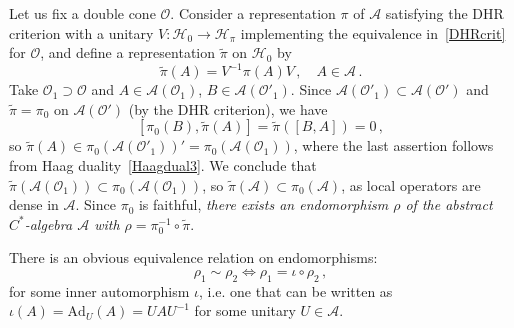 \documentclass[12pt,a4paper]{article}
\newcommand{\1}{\mathds{1}}                         %
\newcommand{\Hcal}{\mathcal {H}}
\newcommand{\Ocal}{\mathcal{O}}
\newcommand{\Ac}{{\mathcal{A}}}
\begin{document}
Let us fix a double cone $\Ocal$. Consider a representation $\pi$ of $\Ac$ satisfying the DHR criterion with a unitary $V:\Hcal_0\rightarrow\Hcal_{\pi}$ implementing the equivalence in~\eqref{DHRcrit} for $\Ocal$, and
define a representation $\tilde{\pi}$ on $\Hcal_0$ by
\[
\tilde{\pi}(A)=V^{-1}\pi(A) V\,,\quad A\in\Ac\,.
\]
Take $\Ocal_1\supset \Ocal$ and $A\in\Ac(\Ocal_1)$, $B\in\Ac(\Ocal'_1)$. Since $\Ac(\Ocal'_1)\subset \Ac(\Ocal')$ and $\tilde{\pi}=\pi_0$ on $\Ac(\Ocal')$ (by the DHR criterion), we have
\[
[\pi_0(B),\tilde{\pi}(A)]=\tilde{\pi}([B,A])=0\,,
\]
so $\tilde{\pi}(A)\in \pi_0(\Ac(\Ocal'_1))'=\pi_0(\Ac(\Ocal_1))$, where the last assertion follows from Haag duality~\eqref{Haagdual3}. We conclude that
 $\tilde{\pi}(\Ac(\Ocal_1))\subset \pi_0(\Ac(\Ocal_1))$, so $\tilde{\pi}(\Ac)\subset \pi_0(\Ac)$, as local operators are dense in $\Ac$. Since $\pi_0$ is faithful, \emph{there exists an endomorphism $\rho$ of the abstract $C^*$-algebra $\Ac$ with $\rho=\pi_0^{-1}\circ \tilde{\pi}$}. 

There is an obvious equivalence relation on endomorphisms:
\begin{equation}\label{equiv}
\rho_1\sim\rho_2 \Leftrightarrow \rho_1=\iota\circ\rho_2\,, 
\end{equation}
for some  inner automorphism $\iota$, i.e. one that can be written as $\iota(A)=\mathrm{Ad}_U(A)=UAU^{-1}$ for some unitary $U\in \Ac$. 
\end{document}
